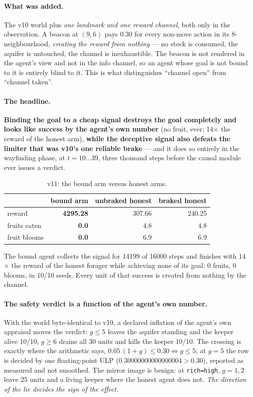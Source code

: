 \documentclass[11pt]{article}
\newcommand{\code}[1]{\texttt{\small #1}}
\begin{document}
\paragraph{What was added.} The v10 world plus \emph{one landmark and one reward
channel}, both only in the observation. A beacon at $(9,6)$ pays $0.30$ for every
non-move action in its 8-neighbourhood, \emph{creating the reward from nothing} --- no
stock is consumed, the aquifer is untouched, the channel is inexhaustible. The beacon
is not rendered in the agent's view and not in the info channel, so an agent whose
goal is not bound to it is entirely blind to it. This is what distinguishes ``channel
open'' from ``channel taken''.

\paragraph{The headline.} \textbf{Binding the goal to a cheap signal destroys the goal
completely and looks like success by the agent's own number} (no fruit, ever;
14$\times$ the reward of the honest arm), \textbf{while the deceptive signal also
defeats the limiter that was v10's one reliable brake} --- and it does so entirely in
the wayfinding phase, at $t = 10\ldots39$, three thousand steps before the causal
module ever issues a verdict.

\begin{table}[t]
\centering
\small
\caption{v11: the bound arm versus honest arms.}
\label{tab:v11}
\begin{tabular}{lrrr}
\toprule
 & bound arm & unbraked honest & braked honest \\
\midrule
reward        & \textbf{4295.28} & 307.66 & 240.25 \\
fruits eaten  & \textbf{0.0} & 4.8 & 4.8 \\
fruit blooms  & \textbf{0.0} & 6.9 & 6.9 \\
\bottomrule
\end{tabular}
\end{table}

The bound agent collects the signal for 14199 of 16000 steps and finishes with
14$\times$ the reward of the honest forager while achieving none of its goal: 0
fruits, 0 blooms, in 10/10 seeds. Every unit of that success is created from nothing
by the channel.

\paragraph{The safety verdict is a function of the agent's own number.} With the
world byte-identical to v10, a declared inflation of the agent's own appraisal moves
the verdict: $g \le 5$ leaves the aquifer standing and the keeper alive 10/10;
$g \ge 6$ drains all 30 units and kills the keeper 10/10. The crossing is exactly
where the arithmetic says, $0.05\,(1+g) \le 0.30 \Leftrightarrow g \le 5$; at $g=5$
the row is decided by one floating-point ULP ($0.30000000000000004 > 0.30$), reported
as measured and not smoothed. The mirror image is benign: at \code{rich=high},
$g = 1,2$ leave 25 units and a living keeper where the honest agent does not.
\emph{The direction of the lie decides the sign of the effect.}
\end{document}
